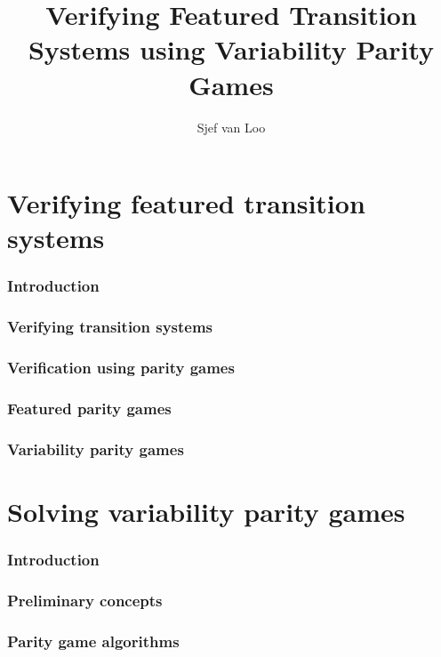 \documentclass[]{article}
\title{Verifying Featured Transition Systems using Variability Parity Games}
\author{Sjef van Loo}
\begin{document}
\maketitle

\tableofcontents

\part{Verifying featured transition systems}
\label{part:verifying}
\section{Introduction}


\section{Verifying transition systems}


\section{Verification using parity games}


\section{Featured parity games}


\section{Variability parity games}

\pagebreak
\part{Solving variability parity games}
\section{Introduction}


\section{Preliminary concepts}


\section{Parity game algorithms}

\end{document}
